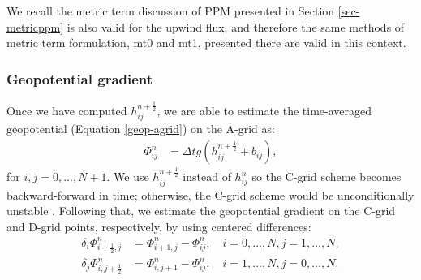 We recall the metric term discussion of PPM presented in Section \ref{sec-metricppm} is also valid for the upwind flux,
and therefore the same methods of metric term formulation, mt0 and mt1, presented there are valid in this context.

\subsubsection{Geopotential gradient}
Once we have computed $h^{n+\frac{1}{2}}_{ij}$, we are able to estimate the time-averaged geopotential (Equation \eqref{geop-agrid}) on the A-grid as:
\begin{align}
	\label{2d-sw-eq-Cgrid-geo}
	 \Phi^n_{ij} &= \Delta t {g(h^{n+\frac{1}{2}}_{ij} + b_{ij})},
\end{align}
for $i,j=0, \ldots, N+1$.
We use $h^{n+\frac{1}{2}}_{ij}$ instead of $h^{n}_{ij}$ so the C-grid scheme becomes backward-forward in time;
otherwise, the C-grid scheme would be unconditionally unstable \citep{lin:1997}.
Following that, we estimate the geopotential gradient on the C-grid and D-grid points, respectively, by using centered differences:
\begin{align}
	\label{2d-sw-eq-Cgrid-geo-dx}
	\delta_i \Phi^n_{i+\frac{1}{2},j} &= \Phi^{n}_{i+1,j} - \Phi^{n}_{ij},
	\quad i=0,\ldots,N, j=1,\ldots,N,\\
	\label{2d-sw-eq-Cgrid-geo-dy}
	\delta_j \Phi^n_{i,j+\frac{1}{2}} &= \Phi^{n}_{i,j+1} - \Phi^{n}_{ij},
	\quad i=1,\ldots,N, j=0,\ldots,N.
\end{align}
